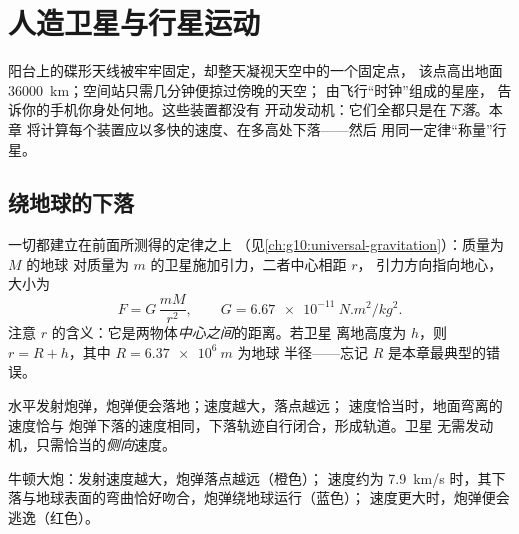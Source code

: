 \chapter{人造卫星与行星运动}\label{ch:g12:satellites-kepler}

阳台上的碟形天线被牢牢固定，却整天凝视天空中的一个固定点，
该点高出地面 \qty{36000}{km}；空间站只需几分钟便掠过傍晚的天空；
由飞行“时钟”组成的星座，
告诉你的手机你身处何地。这些装置都没有
开动发动机：它们全都只是在\emph{下落}。本章
将计算每个装置应以多快的速度、在多高处下落——然后
用同一定律“称量”行星。

\section{绕地球的下落}

一切都建立在前面所测得的定律之上
（见\cref{ch:g10:universal-gravitation}）：质量为 $M$ 的地球
对质量为 $m$ 的卫星施加引力，二者中心相距 $r$，
引力方向指向地心，大小为
\[ F = G\,\frac{m M}{r^2}, \qquad G = \qty{6.67e-11}{N.m^2/kg^2}. \]
注意 $r$ 的含义：它是两物体\emph{中心之间}的距离。若卫星
离地高度为 $h$，则 $r = R + h$，其中 $R = \qty{6.37e6}{m}$ 为地球
半径——忘记 $R$ 是本章最典型的错误。

\begin{remark}[牛顿大炮，再谈]\label{rem:g12:satellites-kepler:cannon}
水平发射炮弹，炮弹便会落地；速度越大，落点越远；
速度恰当时，地面弯离的速度恰与
炮弹下落的速度相同，下落轨迹自行闭合，形成轨道。卫星
无需发动机，只需恰当的\emph{侧向}速度。
\end{remark}

\begin{omfigure}

{\small 牛顿大炮：发射速度越大，炮弹落点越远（橙色）；
速度约为 \qty{7.9}{km/s} 时，其下落与地球表面的弯曲恰好吻合，炮弹绕地球运行（蓝色）；
速度更大时，炮弹便会逃逸（红色）。}
\end{omfigure}

